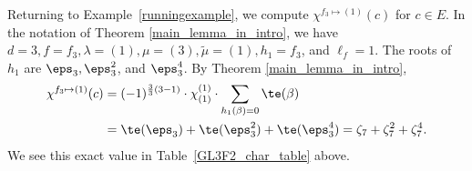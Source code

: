 \begin{example}
Returning to Example~\ref{runningexample}, we compute $\chi^{f_3 \mapsto (1)} (c)$ for $c \in E$.
In the notation of Theorem \ref{main_lemma_in_intro}, we have $d = 3, f = f_3, \lambda = (1), \mu = (3), \tilde{\mu} = (1), h_1 = f_3$, and $\ell_f = 1$.
The roots of $h_1$ are $\eps_3, \eps_3^2$, and $\eps_3^4$.
By Theorem \ref{main_lemma_in_intro},
\begin{align*}
\chi^{f_3 \mapsto (1)} (c)
& =
(-1)^{\frac{3}{3}(3-1)}
\cdot
\chi^{(1)}_{(1)}
\cdot
\sum_{h_1(\beta) = 0} \te(\beta) \\
& = \te(\eps_3) + \te(\eps_3^2) + \te(\eps_3^4)
= \zeta_7 + \zeta_7^2 + \zeta_7^4.
\end{align*}
We see this exact value in Table~\ref{GL3F2_char_table} above.
\end{example}






